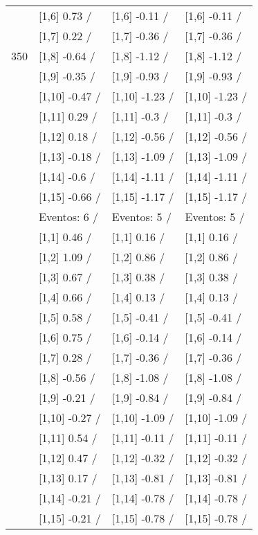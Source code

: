 \begin{table}
\begin{tabular}[t]{llll}
 & {}[1,6] 0.73  / & {}[1,6] -0.11  / & {}[1,6] -0.11  /\\
 & {}[1,7] 0.22  / & {}[1,7] -0.36  / & {}[1,7] -0.36  /\\
350 & {}[1,8] -0.64  / & {}[1,8] -1.12  / & {}[1,8] -1.12  /\\
\addlinespace
 & {}[1,9] -0.35  / & {}[1,9] -0.93  / & {}[1,9] -0.93  /\\
 & {}[1,10] -0.47  / & {}[1,10] -1.23  / & {}[1,10] -1.23  /\\
 & {}[1,11] 0.29  / & {}[1,11] -0.3  / & {}[1,11] -0.3  /\\
 & {}[1,12] 0.18  / & {}[1,12] -0.56  / & {}[1,12] -0.56  /\\
 & {}[1,13] -0.18  / & {}[1,13] -1.09  / & {}[1,13] -1.09  /\\
\addlinespace
 & {}[1,14] -0.6  / & {}[1,14] -1.11  / & {}[1,14] -1.11  /\\
 & {}[1,15] -0.66  / & {}[1,15] -1.17  / & {}[1,15] -1.17  /\\
 & Eventos:  6 / & Eventos:  5 / & Eventos:  5 /\\
 & {}[1,1] 0.46  / & {}[1,1] 0.16  / & {}[1,1] 0.16  /\\
 & {}[1,2] 1.09  / & {}[1,2] 0.86  / & {}[1,2] 0.86  /\\
\addlinespace
 & {}[1,3] 0.67  / & {}[1,3] 0.38  / & {}[1,3] 0.38  /\\
 & {}[1,4] 0.66  / & {}[1,4] 0.13  / & {}[1,4] 0.13  /\\
 & {}[1,5] 0.58  / & {}[1,5] -0.41  / & {}[1,5] -0.41  /\\
 & {}[1,6] 0.75  / & {}[1,6] -0.14  / & {}[1,6] -0.14  /\\
 & {}[1,7] 0.28  / & {}[1,7] -0.36  / & {}[1,7] -0.36  /\\
\addlinespace
500 & {}[1,8] -0.56  / & {}[1,8] -1.08  / & {}[1,8] -1.08  /\\
 & {}[1,9] -0.21  / & {}[1,9] -0.84  / & {}[1,9] -0.84  /\\
 & {}[1,10] -0.27  / & {}[1,10] -1.09  / & {}[1,10] -1.09  /\\
 & {}[1,11] 0.54  / & {}[1,11] -0.11  / & {}[1,11] -0.11  /\\
 & {}[1,12] 0.47  / & {}[1,12] -0.32  / & {}[1,12] -0.32  /\\
\addlinespace
 & {}[1,13] 0.17  / & {}[1,13] -0.81  / & {}[1,13] -0.81  /\\
 & {}[1,14] -0.21  / & {}[1,14] -0.78  / & {}[1,14] -0.78  /\\
 & {}[1,15] -0.21  / & {}[1,15] -0.78  / & {}[1,15] -0.78  /\\
\bottomrule
\end{tabular}
\end{table}

